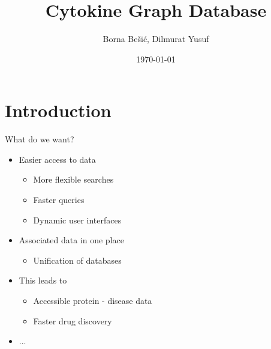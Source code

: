 \documentclass{beamer}
\title[Cytokine Graph DB]{ Cytokine Graph Database } %
\author{ Borna Bešić, Dilmurat Yusuf } %
\institute[] %
{
Bioinformatics Group \\
\medskip
Albert-Ludwigs-Universität, Freiburg  %
}
\date{\today} %
\begin{document}
\begin{frame}
\titlepage %
\end{frame}



\section{Introduction} %

\begin{frame}{What do we want?}
\begin{itemize}
    \item Easier access to data
    \begin{itemize}
        \item More flexible searches
        \item Faster queries
        \item Dynamic user interfaces
    \end{itemize}
    \vfill
    \item Associated data in one place
    \begin{itemize}
        \item Unification of databases
    \end{itemize}
    \vfill
    \item This leads to
    \begin{itemize}
        \item Accessible protein - disease data
        \item Faster drug discovery
    \end{itemize}
    \vfill
    \item ...
\end{itemize}
\end{frame}
\end{document}
